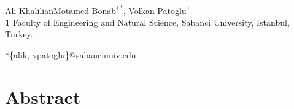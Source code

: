 \documentclass[10pt,letterpaper]{article}
\begin{document}
\vspace*{0.2in}

\begin{flushleft}
{\Large
\textbf{} %
}
\newline
\\
Ali KhalilianMotamed Bonab\textsuperscript{1*},
Volkan Patoglu\textsuperscript{1}
\\
\bigskip
\textbf{1} Faculty of Engineering and Natural Science, Sabanci University, Istanbul, Turkey.
\\
\bigskip

*\{alik, vpatoglu\}@sabanciuniv.edu

\end{flushleft}
 \section*{Abstract}

\end{document}
